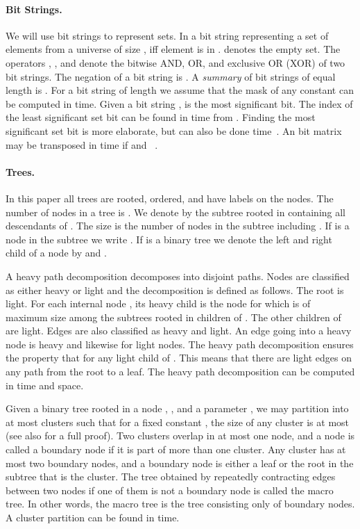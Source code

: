 \documentclass[11pt]{article}
\begin{document}
\paragraph{Bit Strings.}
We will use bit strings to represent sets. In a bit string  representing a set  of elements from a universe of size ,  iff element  is in .  denotes the empty set. The operators , , and  denote the bitwise AND, OR, and exclusive OR (XOR) of two bit strings. The negation of a bit string  is . A \emph{summary}  of  bit strings  of equal length is . For a bit string of length  we assume that the mask of any constant can be computed in  time. Given a bit string ,  is the most significant bit. The index of the least significant set bit can be found in  time from . Finding the most significant set bit is more elaborate, but can also be done  time~\cite{fredman1993surpassing}. An  bit matrix may be transposed in  time if  and ~\cite{thorup2002randomized}.

\paragraph{Trees.}
In this paper all trees are rooted, ordered, and have labels on the nodes. The number of nodes in a tree  is . We denote by  the subtree rooted in  containing all descendants of . The size  is the number of nodes in the subtree  including . If  is a node in the subtree  we write . If  is a binary tree we denote the left and right child of a node  by  and . 

A heavy path decomposition \cite{sleator1983data} decomposes  into disjoint paths. Nodes are classified as either heavy or light and the decomposition is defined as follows. The root is light. For each internal node , its heavy child  is the node for which  is of maximum size among the subtrees rooted in children of . The other children of  are light. Edges are also classified as heavy and light. An edge going into a heavy node is heavy and likewise for light nodes. The heavy path decomposition ensures the property that  for any light child  of . This means that there are  light edges on any path from the root to a leaf. The heavy path decomposition can be computed in  time and space.

Given a binary tree  rooted in a node , , and a parameter , we may partition  into at most  clusters such that for a fixed constant , the size of any cluster is at most  \cite{alstrup1997optimal,alstrup1997minimizing} (see also \cite{abiteboul2006compact} for a full proof). Two clusters overlap in at most one node, and a node is called a boundary node if it is part of more than one cluster. Any cluster has at most two boundary nodes, and a boundary node is either a leaf or the root in the subtree that is the cluster. The tree obtained by repeatedly contracting edges between two nodes if one of them is not a boundary node is called the macro tree. In other words, the macro tree is the tree consisting only of boundary nodes. A cluster partition can be found in  time.
\end{document}
